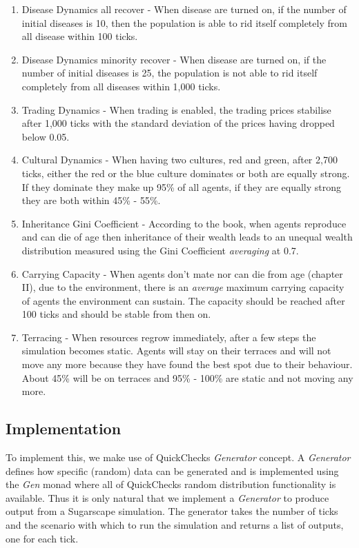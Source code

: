 \begin{enumerate}
	\item Disease Dynamics all recover - When disease are turned on, if the number of initial diseases is 10, then the population is  able to rid itself completely from all disease within 100 ticks. 
	
	\item Disease Dynamics minority recover - When disease are turned on, if the number of initial diseases is 25, the population is not able to rid itself completely from all diseases within 1,000 ticks.
	
	\item Trading Dynamics - When trading is enabled, the trading prices stabilise after 1,000 ticks with the standard deviation of the prices having dropped below 0.05.
	
	\item Cultural Dynamics - When having two cultures, red and green, after 2,700 ticks, either the red or the blue culture dominates or both are equally strong. If they dominate they make up 95\% of all agents, if they are equally strong they are both within 45\% - 55\%.
	
	\item Inheritance Gini Coefficient - According to the book, when agents reproduce and can die of age then inheritance of their wealth leads to an unequal wealth distribution measured using the Gini Coefficient \textit{averaging} at 0.7.
	
	\item Carrying Capacity - When agents don't mate nor can die from age (chapter II), due to the environment, there is an \textit{average} maximum carrying capacity of agents the environment can sustain. The capacity should be reached after 100 ticks and should be stable from then on.
		
	\item Terracing - When resources regrow immediately, after a few steps the simulation becomes static. Agents will stay on their terraces and will not move any more because they have found the best spot due to their behaviour. About 45\% will be on terraces and 95\% - 100\% are static and not moving any more.
\end{enumerate}

\subsection{Implementation}
To implement this, we make use of QuickChecks \textit{Generator} concept. A \textit{Generator} defines how specific (random) data can be generated and is implemented using the \textit{Gen} monad where all of QuickChecks random distribution functionality is available. Thus it is only natural that we implement a \textit{Generator} to produce output from a Sugarscape simulation. The generator takes the number of ticks and the scenario with which to run the simulation and returns a list of outputs, one for each tick.

